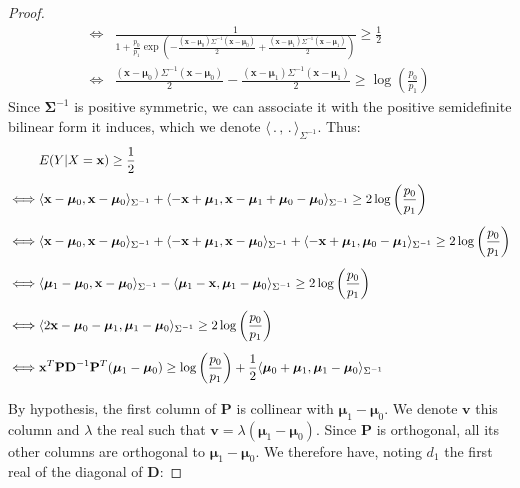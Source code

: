 \documentclass[preprint,12pt]{elsarticle}
\begin{document}
\begin{proof}
\begin{align}
    \iff & \frac{1}{1 + \frac{p_0}{p_1}\exp\left( -\frac{(\mathbf{x} - \bm{\mu}_0)\Sigma^{-1}(\mathbf{x} - \bm{\mu}_0)}{2} + \frac{(\mathbf{x} - \bm{\mu}_1)\Sigma^{-1}(\mathbf{x} - \bm{\mu}_1)}{2}\right)} \geq \frac{1}{2}\\[5 pt]
    \iff & \frac{(\mathbf{x}- \bm{\mu}_0)\Sigma^{-1}(\mathbf{x} - \bm{\mu}_0)}{2} - \frac{(\mathbf{x} - \bm{\mu}_1)\Sigma^{-1}(\mathbf{x} - \bm{\mu}_1)}{2} \geq \log\left(\frac{p_0}{p_1} \right)
\end{align}
Since $\bm{\Sigma}^{-1}$ is positive symmetric, we can associate it with the positive semidefinite bilinear form it induces, which we denote $\langle \, . \,,\, . \,\rangle_{\Sigma^{-1}}$. Thus:
\begin{align}
    & E(Y|X = \mathbf{x}) \geq \frac{1}{2} \hspace{2 cm} \phantom{2} \\[5 pt]
    \iff & \langle \mathbf{x}- \bm{\mu}_0, \mathbf{x}- \bm{\mu}_0\rangle_{\Sigma^{-1}} + \langle -\mathbf{x} + \bm{\mu}_1 , \mathbf{x} - \bm{\mu}_1 + \bm{\mu}_0 - \bm{\mu}_0\rangle_{\Sigma^{-1}} \geq 2\log\left(\frac{p_0}{p_1} \right) \\[5 pt]
    \iff & \langle \mathbf{x}- \bm{\mu}_0, \mathbf{x}- \bm{\mu}_0\rangle_{\Sigma^{-1}} + \langle - \mathbf{x} + \bm{\mu}_1, \mathbf{x}- \bm{\mu}_0\rangle_{\Sigma^{-1}} + \langle -\mathbf{x} + \bm{\mu}_1 , \bm{\mu}_0 - \bm{\mu}_1 \rangle_{\Sigma^{-1}} \geq 2\log\left(\frac{p_0}{p_1} \right) \\[5 pt]
    \iff & \langle \bm{\mu}_1 - \bm{\mu}_0 , \mathbf{x} - \bm{\mu}_0 \rangle_{\Sigma^{-1}} - \langle \bm{\mu}_1 - \mathbf{x}, \bm{\mu}_1 - \bm{\mu}_0\rangle_{\Sigma^{-1}} \geq 2\log\left(\frac{p_0}{p_1} \right) \hspace{-0.5 cm} \phantom{2}\\[5 pt]
    \iff & \langle 2\mathbf{x} - \bm{\mu}_0 - \bm{\mu}_1, \bm{\mu}_1 - \bm{\mu}_0 \rangle_{\Sigma^{-1}} \geq 2\log\left(\frac{p_0}{p_1} \right) \hspace{-0.5 cm} \phantom{2} \\[5 pt]
    \iff & \mathbf{x}^T\mathbf{P}\mathbf{D}^{-1}\mathbf{P}^T(\bm{\mu}_1 - \bm{\mu}_0) \geq \log\left(\frac{p_0}{p_1} \right) + \frac{1}{2}\langle \bm{\mu}_0 + \bm{\mu}_1 , \bm{\mu}_1 - \bm{\mu}_0\rangle_{\Sigma^{-1}} \hspace{-0.5 cm} \phantom{2} \\[5 pt]
\end{align}
By hypothesis, the first column of $\mathbf{P}$ is collinear with $\bm{\mu}_1 - \bm{\mu}_0$. We denote $\mathbf{v}$ this column and $\lambda$ the real such that $\mathbf{v} = \lambda (\bm{\mu}_1 - \bm{\mu}_0)$. Since $\mathbf{P}$ is orthogonal, all its other columns are orthogonal to $\bm{\mu}_1 - \bm{\mu}_0$. We therefore have, noting $d_1$ the first real of the diagonal of $\mathbf{D}$:

\end{proof}
\end{document}
